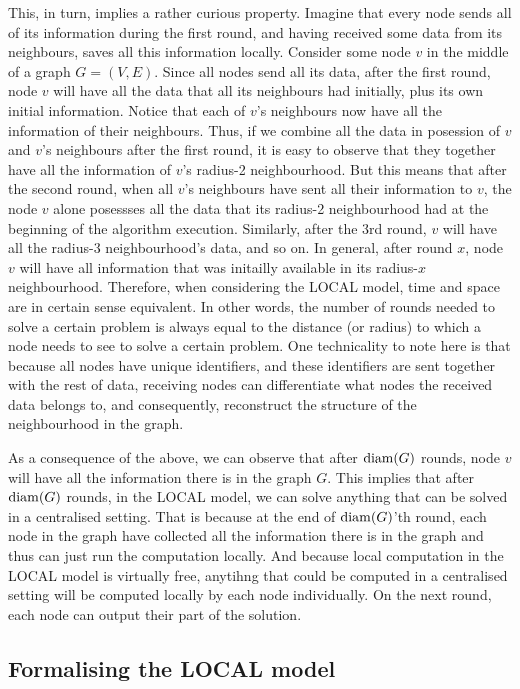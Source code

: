 This, in turn, implies a rather
curious property. Imagine that every node sends all of its information during the first round,
and having received some data from its neighbours, saves all this information locally. Consider
some node $v$ in the middle of a graph $G = (V, E)$. Since all nodes send all its data,
after the first round, node $v$
will have all the data that all its neighbours had initially, plus its own initial information.
Notice that each of $v$'s neighbours now have all the information of their neighbours. Thus,
if we combine all the data in posession of $v$ and $v$'s neighbours after the first round, it
is easy to observe that they together have all the information of $v$'s radius-2 neighbourhood.
But this means that after the second round, when all $v$'s neighbours have sent all their
information to $v$, the node $v$ alone posessses all the data that its radius-2 neighbourhood had at the
beginning of the algorithm execution. Similarly, after the 3rd round, $v$ will have all the
radius-3 neighbourhood's data, and so on.
In general, after round $x$, node $v$ will have
all information that was initailly available in its radius-$x$ neighbourhood.
Therefore, when considering the LOCAL model,
time and space are in certain sense equivalent. In other words, the number of rounds
needed to solve a certain problem is always equal to the distance (or radius) to which a node needs to
see to solve a certain problem. One technicality to note here is that because all nodes have
unique identifiers, and these identifiers are sent together with the rest of data,
receiving nodes can differentiate what nodes the received data belongs to, and consequently,
reconstruct the structure of the neighbourhood in the graph.

As a consequence of the above,
we can observe that after $\operatorname{diam}(G)$ rounds, node $v$ will have all the information there is in the 
graph $G$. This implies that after $\operatorname{diam}(G)$ rounds, in the LOCAL model, we can solve anything that can
be solved in a centralised setting. That is because at the end of $\operatorname{diam}(G)$'th round, each node in the
graph have collected all the information there is in the graph and thus can just run the
computation locally. And because local computation in the LOCAL model is virtually free,
anytihng that could be computed in a centralised setting will be computed locally by each
node individually. On the next round, each node can output their part of the solution.

\subsection{Formalising the LOCAL model}

